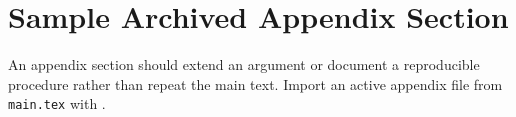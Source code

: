 \section{Sample Archived Appendix Section}
\label{app:sample-archived-section}

An appendix section should extend an argument or document a reproducible procedure rather than repeat the main text.
Import an active appendix file from \texttt{main.tex} with \verb||.
